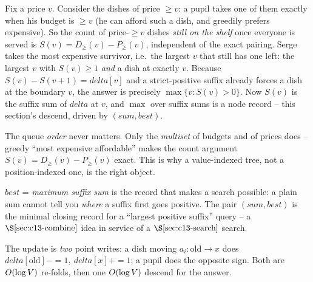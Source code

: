 Fix a price \(v\).  Consider the dishes of price \(\ge v\): a pupil takes one of
them exactly when his budget is \(\ge v\) (he can afford such a dish, and greedily
prefers expensive).  So the count of price-\(\ge v\) dishes \emph{still on the
shelf} once everyone is served is \(S(v)=D_{\ge}(v)-P_{\ge}(v)\), independent of
the exact pairing.  Serge takes the most expensive survivor, i.e.\ the largest
\(v\) that still has one left: the largest \(v\) with \(S(v)\ge 1\) \emph{and} a
dish at exactly \(v\).  Because \(S(v)-S(v{+}1)=\mathit{delta}[v]\) and a
strict-positive suffix already forces a dish at the boundary \(v\), the answer is
precisely \(\max\{v: S(v)>0\}\).  Now \(S(v)\) is the suffix sum of
\(\mathit{delta}\) at \(v\), and \(\max\) over suffix sums is a node record -- this
section's descend, driven by \((\mathit{sum},\mathit{best})\).

\begin{observation}
The queue \emph{order} never matters.  Only the \emph{multiset} of budgets and of
prices does -- greedy ``most expensive affordable'' makes the count argument
\(S(v)=D_{\ge}(v)-P_{\ge}(v)\) exact.  This is why a value-indexed tree, not a
position-indexed one, is the right object.
\end{observation}
\begin{observation}
\(\mathit{best}\) = \emph{maximum suffix sum} is the record that makes a search
possible: a plain sum cannot tell you \emph{where} a suffix first goes positive.
The pair \((\mathit{sum},\mathit{best})\) is the minimal closing record for a
``largest positive suffix'' query -- a \(\secref{c13-combine}\) idea in service of
a \(\secref{c13-search}\) search.
\end{observation}
\begin{observation}
The update is \emph{two} point writes: a dish moving \(a_i:\)old\(\to x\) does
\(\mathit{delta}[\text{old}]-{=}1,\ \mathit{delta}[x]+{=}1\); a pupil does the
opposite sign.  Both are \(O(\log V)\) re-folds, then one \(O(\log V)\)
descend for the answer.
\end{observation}

